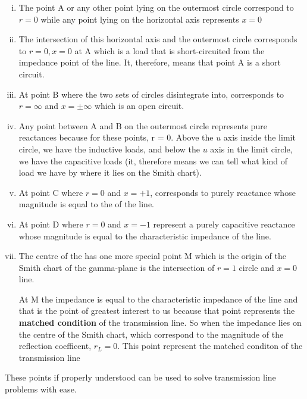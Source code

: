 \begin{enumerate}[(i)]
\item The point A or any other point lying on the outermost circle correspond to $r = 0$ while any point lying on the horizontal axis represents $x = 0$

\item The intersection of this horizontal axis and the outermost circle corresponds to $r = 0,x = 0$ at A which is a load that is short-circuited from the impedance point of the line. It, therefore, means that point A is a short circuit.

\item At point B where the two sets of circles disintegrate into, corresponds to $r = \infty$ and $x = \pm\infty $ which is an open circuit.

\item Any point between A and B on the outermost circle represents pure reactances because for these points, r = 0. Above the $u$ axis inside the limit circle, we have the inductive loads, and below the $u$ axis in the limit circle, we have the capacitive loads (it, therefore means we can tell what kind of load we have by where it lies on the Smith chart).

\item At point C where $r = 0$ and $x = +1$, corresponds to purely reactance whose magnitude is equal to the  of the line.

\item At point D where $r = 0$ and $x = -1$ represent a purely capacitive reactance whose magnitude is equal to the characteristic impedance of the line.

\item The centre of the  has one more special point M which is the origin of the Smith chart of the gamma-plane is the intersection of $r = 1$ circle and $x = 0$ line.

At M the impedance is equal to the characteristic impedance of the line and that is the point of greatest interest to us because that point represents the \textbf{matched condition} of the transmission line. So when the impedance lies on the centre of the Smith chart, which correspond to the magnitude of the reflection coefficent, $r_L = 0$. This point represent the matched conditon of the transmission line
\end{enumerate}
These points if properly understood can be used to solve transmission line problems with ease.


